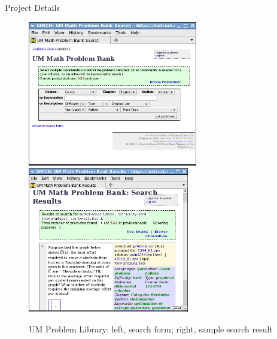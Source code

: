 \documentclass[11pt]{article}
\begin{document}
\begin{section}{Project Details}

\begin{figure}
\begin{center}
\includegraphics[height=2.5in]{um_search1}\quad
\includegraphics[height=2.5in]{um_result1}\\
\caption{UM Problem Library: left, search form; right, sample search result}
\label{umprobbank}
\end{center}
\end{figure}


\end{section}
\end{document}
